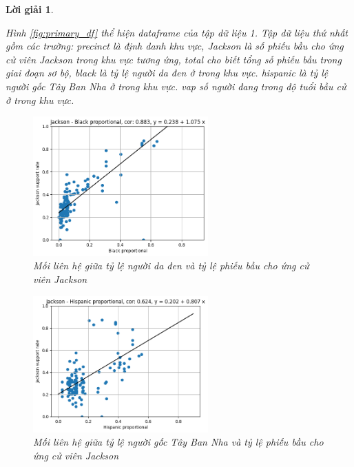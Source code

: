 \documentclass[14pt, a4paper]{article}
\theoremstyle{sltheorem}
\theoremstyle{soltheorem}
\newtheorem*{loigiai}{Lời giải}
\begin{document}
\begin{loigiai}
\begin{enumerate}
    Hình \ref{fig:primary_df} thể hiện dataframe của tập dữ liệu 1.
    Tập dữ liệu thứ nhất gồm các trường: precinct là định danh khu vực,
    Jackson là số phiếu bầu cho ứng cử viên Jackson trong khu vực tương ứng,
    total cho biết tổng số phiếu bầu trong giai đoạn sơ bộ,
    black là tỷ lệ người da đen ở trong khu vực.
    hispanic là tỷ lệ người gốc Tây Ban Nha ở trong khu vực.
    vap số người đang trong độ tuổi bầu cử ở trong khu vực.

    \begin{figure}[H]
        \centering
        \includegraphics[width=0.6\textwidth]{figures/Jackson_support_rate-Black_proportional-Dataset_1.png}
        \caption{Mối liên hệ giữa tỷ lệ người da đen và tỷ lệ phiếu bầu cho ứng cử viên Jackson}
        \label{fig:Jackson_support_rate_Black_proportional_Dataset_1}
    \end{figure}

    \begin{figure}[H]
        \centering
        \includegraphics[width=0.6\textwidth]{figures/Jackson_support_rate-Hispanic_proportional-Dataset_1.png}
        \caption{Mối liên hệ giữa tỷ lệ người gốc Tây Ban Nha và tỷ lệ phiếu bầu cho ứng cử viên Jackson}
        \label{fig:Jackson_support_rate_Hispanic_proportional_Dataset_1}
    \end{figure}


\end{enumerate}
\end{loigiai}
\end{document}
